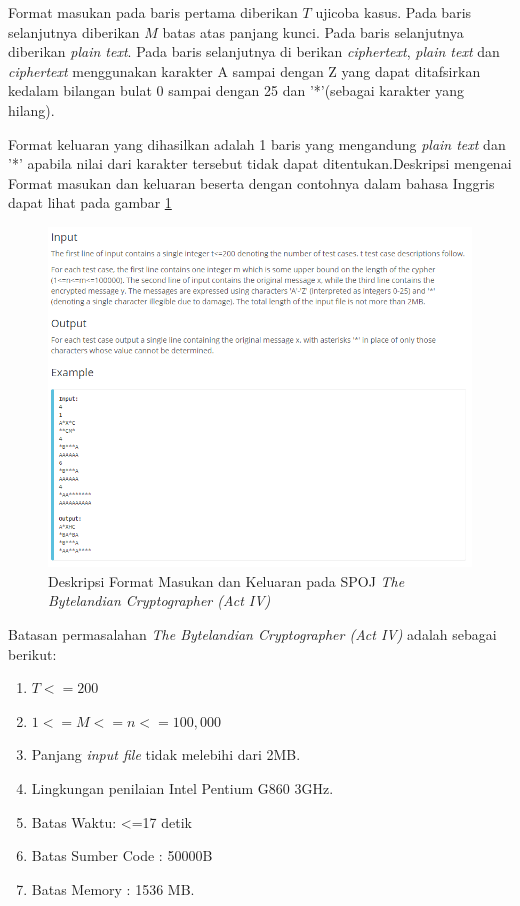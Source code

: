 	
	Format masukan pada baris pertama diberikan $T$ ujicoba kasus. Pada baris selanjutnya diberikan $M$ batas atas panjang kunci. Pada baris selanjutnya diberikan \textit{plain text}. Pada baris selanjutnya di berikan \textit{ciphertext}, \textit{plain text} dan \textit{ciphertext} menggunakan karakter A sampai dengan Z yang dapat ditafsirkan kedalam bilangan bulat 0 sampai dengan 25 dan '*'(sebagai karakter yang hilang).
	
	
	Format keluaran yang dihasilkan adalah 1 baris yang mengandung \textit{plain text} dan '*' apabila nilai dari karakter tersebut tidak dapat ditentukan.Deskripsi mengenai Format masukan dan keluaran beserta dengan contohnya dalam bahasa Inggris dapat lihat pada gambar \ref{fig:crypto4_io}
	\begin{figure}[H]
		\centering
		\includegraphics[scale=0.5]{images/bab2/crypto_io.png}
		\caption{Deskripsi Format Masukan dan Keluaran pada SPOJ \textit{The Bytelandian Cryptographer (Act IV)}}
		\label{fig:crypto4_io}
	\end{figure}
	
	
	Batasan permasalahan \textit{The Bytelandian Cryptographer (Act IV)} adalah sebagai berikut:
	\begin{enumerate}
		\item $T<=200$
		\item $1<=M<=n<=100,000$
		\item Panjang \textit{input file} tidak melebihi dari 2MB.
		\item Lingkungan penilaian Intel Pentium G860 3GHz.
		\item Batas Waktu: <=17 detik
		\item Batas Sumber Code : 50000B
		\item Batas Memory : 1536 MB.                 
	\end{enumerate}


